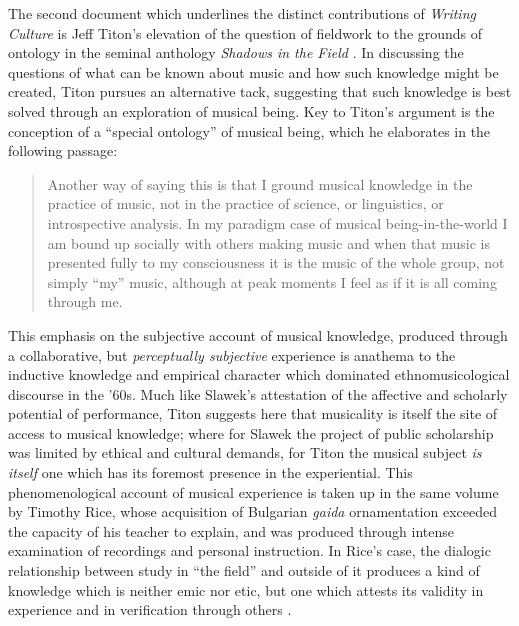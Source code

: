 The second document which underlines the distinct contributions of
\emph{Writing Culture} is Jeff Titon's elevation of the question of
fieldwork to the grounds of ontology in the seminal anthology
\emph{Shadows in the Field} \autocite*{titon_knowing_2008}. In
discussing the questions of what can be known about music and how such
knowledge might be created, Titon pursues an alternative tack,
suggesting that such knowledge is best solved through an exploration of
musical being. Key to Titon's argument is the conception of a ``special
ontology'' of musical being, which he elaborates in the following
passage:

\begin{quote}
Another way of saying this is that I ground musical knowledge in the
practice of music, not in the practice of science, or linguistics, or
introspective analysis. In my paradigm case of musical
being-in-the-world I am bound up socially with others making music and
when that music is presented fully to my consciousness it is the music
of the whole group, not simply ``my'' music, although at peak moments I
feel as if it is all coming through me.
\autocite*[32]{titon_knowing_2008}
\end{quote}

This emphasis on the subjective account of musical knowledge, produced
through a collaborative, but \emph{perceptually subjective} experience
is anathema to the inductive knowledge and empirical character which
dominated ethnomusicological discourse in the '60s. Much like Slawek's
attestation of the affective and scholarly potential of performance,
Titon suggests here that musicality is itself the site of access to
musical knowledge; where for Slawek the project of public scholarship
was limited by ethical and cultural demands, for Titon the musical
subject \emph{is itself} one which has its foremost presence in the
experiential. This phenomenological account of musical experience is
taken up in the same volume by Timothy Rice, whose acquisition of
Bulgarian \emph{gaida} ornamentation exceeded the capacity of his
teacher to explain, and was produced through intense examination of
recordings and personal instruction. In Rice's case, the dialogic
relationship between study in ``the field'' and outside of it produces a
kind of knowledge which is neither emic nor etic, but one which attests
its validity in experience and in verification through others
\autocite*[51-52]{rice_toward_2008}.

